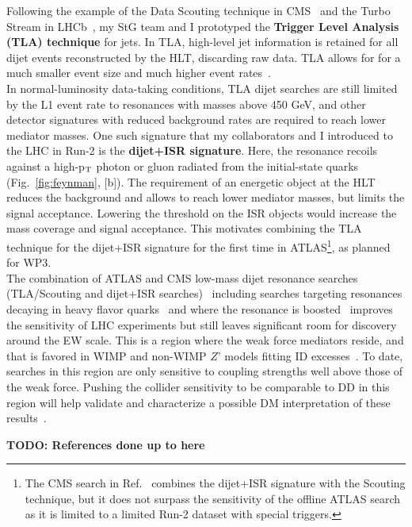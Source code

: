 Following the example of the Data Scouting technique in CMS~\cite{ToBeCited} and the Turbo Stream in LHCb~\cite{ToBeCited}, my StG team and I prototyped the \textbf{Trigger Level Analysis (TLA) technique} for jets. 
In TLA, high-level jet information is retained for all dijet events reconstructed by the HLT, discarding raw data. 
TLA allows for for a much smaller event size and much higher event rates~\cite{ToBeCited}.%
\\
\indent
In normal-luminosity data-taking conditions, TLA dijet searches are still limited by the L1 event rate to resonances with masses above 450 GeV, 
and other detector signatures with reduced background rates are required to reach lower mediator masses. 
One such signature that my collaborators and I introduced to the LHC in Run-2 is the \textbf{dijet+ISR signature}. 
Here, the resonance recoils against a high-p$_{\rm{T}}$ photon or gluon radiated from the initial-state quarks (Fig.~\ref{fig:feynman}, [b]). 
The requirement of an energetic object at the HLT reduces the background and allows to reach lower mediator masses, 
but limits the signal acceptance. 
Lowering the threshold on the ISR objects would increase the mass coverage and signal acceptance.
This motivates combining the TLA technique for the dijet+ISR signature for the first time in ATLAS\footnote{The CMS search in Ref.~\cite{ToBeCited} %
combines the dijet+ISR signature with the Scouting technique, but it does not surpass the sensitivity of the offline ATLAS search as it is limited to a limited Run-2 dataset with special triggers.}, as planned for WP3. 
\\
\indent
The combination of ATLAS and CMS low-mass dijet resonance searches (TLA/Scouting and dijet+ISR searches)~\cite{ToBeCited}
including searches targeting resonances decaying in heavy flavor quarks~\cite{ToBeCited} %
and where the resonance is boosted~\cite{ToBeCited} %
improves the sensitivity of LHC experiments but still leaves significant room for discovery around the EW scale. 
This is a region where the weak force mediators reside, and that is favored in WIMP and non-WIMP $Z’$ models fitting ID excesses~\cite{ToBeCited}. %
To date, searches in this region are only sensitive to coupling strengths well above those of the weak force. 
Pushing the collider sensitivity to be comparable to DD in this region will help validate and characterize a possible DM interpretation of these results~\cite{Ellis:2018xal,Kang:2020huh}.

\color{red}\textbf{TODO: References done up to here}\color{black}


